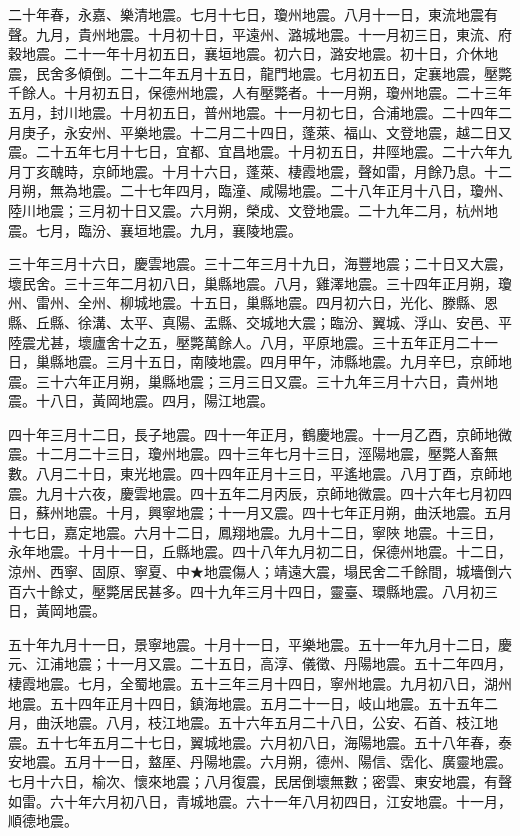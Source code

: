 \begin{pinyinscope}
二十年春，永嘉、樂清地震。七月十七日，瓊州地震。八月十一日，東流地震有聲。九月，貴州地震。十月初十日，平遠州、潞城地震。十一月初三日，東流、府穀地震。二十一年十月初五日，襄垣地震。初六日，潞安地震。初十日，介休地震，民舍多傾倒。二十二年五月十五日，龍門地震。七月初五日，定襄地震，壓斃千餘人。十月初五日，保德州地震，人有壓斃者。十一月朔，瓊州地震。二十三年五月，封川地震。十月初五日，普州地震。十一月初七日，合浦地震。二十四年二月庚子，永安州、平樂地震。十二月二十四日，蓬萊、福山、文登地震，越二日又震。二十五年七月十七日，宜都、宜昌地震。十月初五日，井陘地震。二十六年九月丁亥醜時，京師地震。十月十六日，蓬萊、棲霞地震，聲如雷，月餘乃息。十二月朔，無為地震。二十七年四月，臨潼、咸陽地震。二十八年正月十八日，瓊州、陸川地震；三月初十日又震。六月朔，榮成、文登地震。二十九年二月，杭州地震。七月，臨汾、襄垣地震。九月，襄陵地震。

三十年三月十六日，慶雲地震。三十二年三月十九日，海豐地震；二十日又大震，壞民舍。三十三年二月初八日，巢縣地震。八月，雞澤地震。三十四年正月朔，瓊州、雷州、全州、柳城地震。十五日，巢縣地震。四月初六日，光化、滕縣、恩縣、丘縣、徐溝、太平、真陽、盂縣、交城地大震；臨汾、翼城、浮山、安邑、平陸震尤甚，壞廬舍十之五，壓斃萬餘人。八月，平原地震。三十五年正月二十一日，巢縣地震。三月十五日，南陵地震。四月甲午，沛縣地震。九月辛巳，京師地震。三十六年正月朔，巢縣地震；三月三日又震。三十九年三月十六日，貴州地震。十八日，黃岡地震。四月，陽江地震。

四十年三月十二日，長子地震。四十一年正月，鶴慶地震。十一月乙酉，京師地微震。十二月二十三日，瓊州地震。四十三年七月十三日，涇陽地震，壓斃人畜無數。八月二十日，東光地震。四十四年正月十三日，平遙地震。八月丁酉，京師地震。九月十六夜，慶雲地震。四十五年二月丙辰，京師地微震。四十六年七月初四日，蘇州地震。十月，興寧地震；十一月又震。四十七年正月朔，曲沃地震。五月十七日，嘉定地震。六月十二日，鳳翔地震。九月十二日，寧陜地震。十三日，永年地震。十月十一日，丘縣地震。四十八年九月初二日，保德州地震。十二日，涼州、西寧、固原、寧夏、中★地震傷人；靖遠大震，塌民舍二千餘間，城墻倒六百六十餘丈，壓斃居民甚多。四十九年三月十四日，靈臺、環縣地震。八月初三日，黃岡地震。

五十年九月十一日，景寧地震。十月十一日，平樂地震。五十一年九月十二日，慶元、江浦地震；十一月又震。二十五日，高淳、儀徵、丹陽地震。五十二年四月，棲霞地震。七月，全蜀地震。五十三年三月十四日，寧州地震。九月初八日，湖州地震。五十四年正月十四日，鎮海地震。五月二十一日，岐山地震。五十五年二月，曲沃地震。八月，枝江地震。五十六年五月二十八日，公安、石首、枝江地震。五十七年五月二十七日，翼城地震。六月初八日，海陽地震。五十八年春，泰安地震。五月十一日，盩厔、丹陽地震。六月朔，德州、陽信、霑化、廣靈地震。七月十六日，榆次、懷來地震；八月復震，民居倒壞無數；密雲、東安地震，有聲如雷。六十年六月初八日，青城地震。六十一年八月初四日，江安地震。十一月，順德地震。


\end{pinyinscope}
